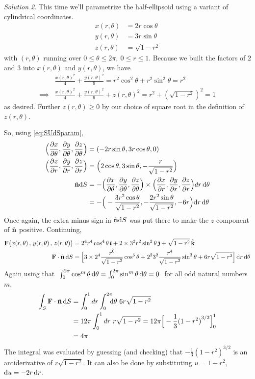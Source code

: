 \begin{eg}
\medskip
\noindent\textit{Solution 2}.  This time we'll parametrize the 
half-ellipsoid using a variant of cylindrical coordinates.
\begin{align*}
x(r,\theta)&=2r\cos\theta\\
y(r,\theta)&=3r\sin\theta\\
z(r,\theta)&=\sqrt{1-r^2}
\end{align*}
with $(r,\theta)$ running over $0\le\theta\le 2\pi,\ 0\le r\le1$. 
Because we built the factors of $2$ and $3$ into $x(r,\theta)$
and $y(r,\theta)$, we have 
\begin{align*}
&\frac{x(r,\theta)^2}{4} + \frac{y(r,\theta)^2}{9}
    =r^2\cos^2\theta+r^2\sin^2\theta = r^2 \\
\implies  &\frac{x(r,\theta)^2}{4} + \frac{y(r,\theta)^2}{9} +z(r,\theta)^2
     = r^2 + \left(\sqrt{1-r^2}\right)^2=1
\end{align*}
as desired. Further $z(r,\theta)\ge 0$ by our choice of square root in the
definition of $z(r,\theta)$.

So, using \eqref{eq:SUdSparam},
\begin{align*}
\Big(\frac{\partial x}{\partial \theta},\frac{\partial y}{\partial \theta},
\frac{\partial z}{\partial \theta}\Big)
&=(-2r\sin\theta,3r\cos\theta,0)
\\
\Big(\frac{\partial x}{\partial r},\frac{\partial y}{\partial r},
\frac{\partial z}{\partial r}\Big)
&=\Big(2\cos\theta,3\sin\theta,-\frac{r}{\sqrt{1-r^2}}\Big)
\\
\hat{\mathbf{n}} \mathrm{d}S&=
-\Big(\frac{\partial x}{\partial\theta},\frac{\partial y}{\partial\theta},
                 \frac{\partial z}{\partial\theta}\Big)
\times\Big(\frac{\partial x}{\partial r},\frac{\partial y}{\partial r},
            \frac{\partial z}{\partial r}\Big)dr\,\mathrm{d}\theta\\
&=-\Big(-\frac{3r^2\cos\theta}{\sqrt{1-r^2}},
-\frac{2r^2\sin\theta}{\sqrt{1-r^2}},-6r\Big)\mathrm{d}r\,\mathrm{d}\theta
\end{align*}
Once again, the extra minus sign in $\hat{\mathbf{n}} \mathrm{d}S$ was put there to make 
the $z$ component of $\hat{\mathbf{n}}$ positive. Continuing,
\begin{align*}
\mathbf{F}\big(x(r,\theta)\,,\,y(r,\theta)\,,\,z(r,\theta)\big)
 &=2^4r^4\cos^4\theta\,\hat{\pmb{\imath}}+2\times 3^2r^2\sin^2\theta\,\hat{\pmb{\jmath}}+\sqrt{1-r^2}\,\hat{\mathbf{k}}
\\
\mathbf{F}\cdot\hat{\mathbf{n}}\, \mathrm{d}S&=\Big[3\times2^4\frac{r^6}{\sqrt{1-r^2}}\cos^5\theta
+2^2 3^2\frac{r^4}{\sqrt{1-r^2}}
\sin^3\theta+6r\sqrt{1-r^2}\Big]\,\mathrm{d}r\,\mathrm{d}\theta
\end{align*}
 Again using that  
$\ \int_0^{2\pi} \cos^m\theta\,\dee{\theta}
  =\int_0^{2\pi} \sin^m\theta\,\dee{\theta}=0\ $ for all
odd natural numbers $m$,
\begin{align*}
\int_S \mathbf{F}\cdot\hat{\mathbf{n}}\, \mathrm{d}S
&=\int_0^1 dr\int_0^{2\pi}\hskip-6pt\mathrm{d}\theta\ 6r\sqrt{1-r^2} \\
&=12\pi\int_0^1 dr\ r\sqrt{1-r^2}
=12\pi\Big[-\frac{1}{3}{(1-r^2)}^{3/2}\Big]_0^1\\
&=4\pi
\end{align*}
The integral was evaluated by guessing (and checking) that 
$-\frac{1}{3}{(1-r^2)}^{3/2}$ is an antiderivative of $r\sqrt{1-r^2}$.
It can also be done by substituting $u=1-r^2$, 
$\mathrm{d}u=-2r\,\mathrm{d}r$.



\end{eg}
